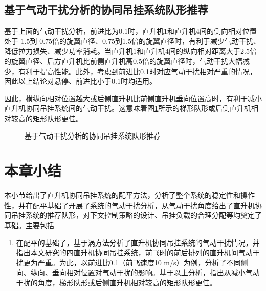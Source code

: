 \subsection{基于气动干扰分析的协同吊挂系统队形推荐}
基于上面的气动干扰分析，前进比为0.1时，直升机1和直升机4间的侧向相对位置处于-1.5到-0.75倍的旋翼直径、0.75到1.5倍的旋翼直径时，有利于减少气动干扰、降低拉力损失、减少功率消耗。当直升机1和直升机4间的纵向相对距离大于2.5倍的旋翼直径、后方直升机比前侧直升机高0.5倍的旋翼直径时，气动干扰大幅减少，有利于提高性能。此外，考虑到前进比0.1时对应气动干扰相对严重的情况，因此以上结论对悬停、前进比小于0.1时均适用。

因此，横纵向相对位置越大或后侧直升机比前侧直升机垂向位置高时，有利于减小直升机协同吊挂系统间的气动干扰。这意味着图\ref{fig:chap3_5_5_1}所示的梯形队形或后侧直升机相对较高的矩形队形更佳。
\begin{figure}[!htb]
  \centering
  \quad
  \caption{基于气动干扰分析的协同吊挂系统队形推荐}
  \label{fig:chap3_5_5_1}
\end{figure}

\section{本章小结}
本小节给出了直升机协同吊挂系统的配平方法，分析了整个系统的稳定性和操作性，并在配平基础了开展了系统的气动干扰分析，从气动干扰角度给出了直升机协同吊挂系统的推荐队形，对下文控制策略的设计、吊挂负载的合理分配等均奠定了基础。主要包括
\begin{enumerate}
  \item 在配平的基础了，基于涡方法分析了直升机协同吊挂系统的气动干扰情况，并指出本文研究的四直升机协同吊挂系统，前飞时的前后排列的直升机间气动干扰更为严重。为此，以前进比0.1（前飞速度10 m/s）为例，分析了不同侧向、纵向、垂向相对位置对气动干扰的影响。基于以上分析，指出从减小气动干扰的角度，梯形队形或后侧直升机相对较高的矩形队形更佳。
\end{enumerate}
